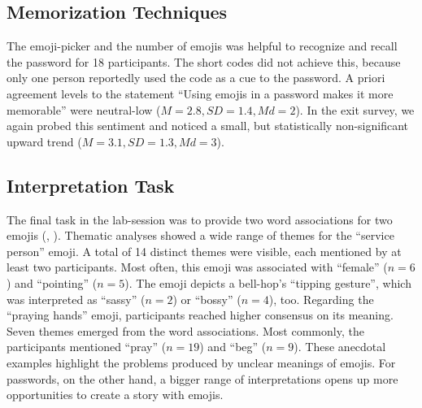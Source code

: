 \subsection{Memorization Techniques}
The emoji-picker and the number of emojis was helpful to recognize and recall the password for 18 participants. The short codes did not achieve this, because only one person reportedly used the code as a cue to the password. A priori agreement levels to the statement ``Using emojis in a password makes it more memorable'' were neutral-low ($M=2.8, SD=1.4, Md=2$). In the exit survey, we again probed this sentiment and noticed a small, but statistically non-significant upward trend ($M=3.1, SD=1.3, Md=3$). 

\subsection{Interpretation Task}
The final task in the lab-session was to provide two word associations for two emojis (, ). Thematic analyses showed a wide range of themes for the ``service person'' emoji. A total of 14 distinct themes were visible, each mentioned by at least two participants. Most often, this emoji was associated with ``female'' ($n=6$) and ``pointing'' ($n=5$). The emoji depicts a bell-hop's ``tipping gesture'', which was interpreted as ``sassy'' ($n=2$) or ``bossy'' ($n=4$), too. Regarding the ``praying hands'' emoji, participants reached higher consensus on its meaning. Seven themes emerged from the word associations. Most commonly, the participants mentioned ``pray'' ($n=19$) and ``beg'' ($n=9$). These anecdotal examples highlight the problems produced by unclear meanings of emojis. For passwords, on the other hand, a bigger range of interpretations opens up more opportunities to create a story with emojis.

